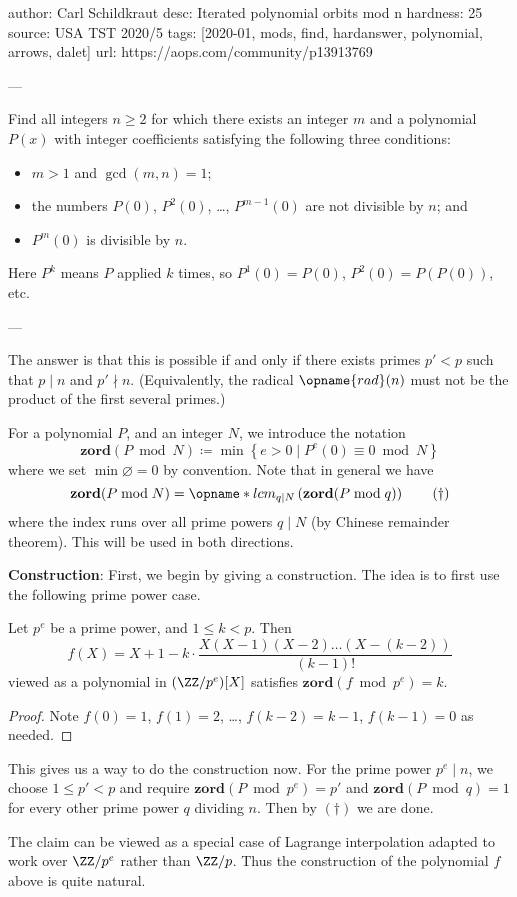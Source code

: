 author: Carl Schildkraut
desc: Iterated polynomial orbits mod n
hardness: 25
source: USA TST 2020/5
tags: [2020-01, mods, find, hardanswer, polynomial, arrows, dalet]
url: https://aops.com/community/p13913769

---

Find all integers $n \ge 2$ for which there exists an integer $m$ and
a polynomial $P(x)$ with integer coefficients satisfying the following three conditions:
\begin{itemize}
  \item $m > 1$ and $\gcd(m,n) = 1$;
  \item the numbers $P(0)$, $P^2(0)$, \dots, $P^{m-1}(0)$ are not divisible by $n$; and
  \item $P^m(0)$ is divisible by $n$.
\end{itemize}
Here $P^k$ means $P$ applied $k$ times, so $P^1(0) = P(0)$, $P^2(0) = P(P(0))$, etc.

---

The answer is that this is possible if and only if
there exists primes $p' < p$ such that $p \mid n$ and $p' \nmid n$.
(Equivalently, the radical $\opname{rad}(n)$
must not be the product of the first several primes.)

For a polynomial $P$, and an integer $N$, we introduce the notation
\[ \mathbf{zord}(P \bmod N)
  \coloneqq \min \left\{ e > 0 \mid P^e(0) \equiv 0 \bmod N \right\} \]
where we set $\min\varnothing=0$ by convention.
Note that in general we have
\[ \mathbf{zord}(P \bmod N) = \opname*{lcm}_{q \mid N}
  \left( \mathbf{zord}(P \bmod q)  \right) \qquad (\dagger) \]
where the index runs over all prime powers
$q \mid N$ (by Chinese remainder theorem).
This will be used in both directions.

\textbf{Construction}:
First, we begin by giving a construction.
The idea is to first use the following prime power case.
\begin{claim*}
  Let $p^e$ be a prime power, and $1 \le k < p$.
  Then
  \[ f(X) = X+1 - k \cdot \frac{X(X-1)(X-2) \dots (X-(k-2))}{(k-1)!} \]
  viewed as a polynomial in $(\ZZ/p^e)[X]$ satisfies $\mathbf{zord}(f \bmod{p^e}) = k$.
\end{claim*}
\begin{proof}
  Note $f(0) = 1$, $f(1) = 2$, \dots, $f(k-2) = k-1$, $f(k-1) = 0$ as needed.
\end{proof}
This gives us a way to do the construction now.
For the prime power $p^e \mid n$, we choose $1 \le p' < p$ and require
$\mathbf{zord}(P \bmod{p^e}) = p'$ and
$\mathbf{zord}(P \bmod{q}) = 1$ for every other prime power $q$ dividing $n$.
Then by $(\dagger)$ we are done.
\begin{remark*}
  The claim can be viewed as a special case of Lagrange interpolation
  adapted to work over $\ZZ/p^e$ rather than $\ZZ/p$.
  Thus the construction of the polynomial $f$ above is quite natural.
\end{remark*}

